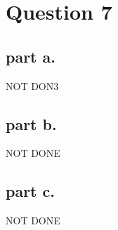 \section{Question 7}

\subsection{part a.}
NOT DON3

\subsection{part b.}
NOT DONE

\subsection{part c.}
NOT DONE
